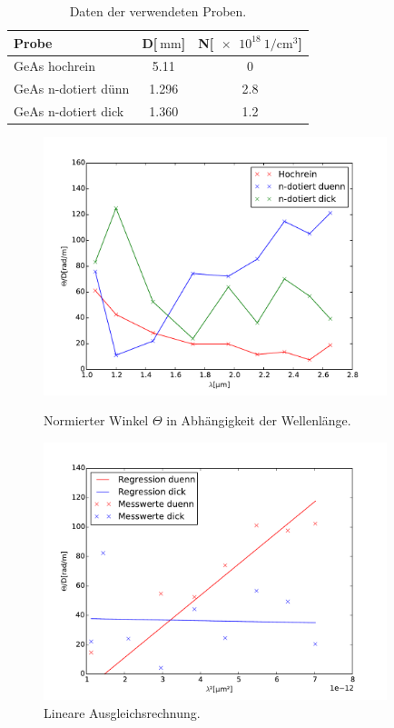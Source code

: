 \begin{table}
	\centering
	\caption{Daten der verwendeten Proben.}
	\begin{tabular}{l S[table-format=1.3] S[table-format=1.1]}
	\toprule
		Probe & {D[$\SI{}{\milli\meter}$]} & {N[$\SI{e18}{1\per\centi\meter^3}$]}\\ 
		\midrule
		GeAs hochrein & 5.11 & 0\\
		GeAs n-dotiert dünn & 1.296 & 2.8\\
		GeAs n-dotiert dick & 1.360 & 1.2\\
		\bottomrule
	\end{tabular}
	\label{data}
\end{table}

\begin{figure}
\centering
	\includegraphics[width = 10cm]{data/theta.pdf}
	\caption{Normierter Winkel $\Theta$ in Abhängigkeit der Wellenlänge.}
	\label{theta}
	\includegraphics[width = 10cm]{data/fit.pdf}
	\caption{Lineare Ausgleichsrechnung.}
	\label{fit}
\end{figure}

